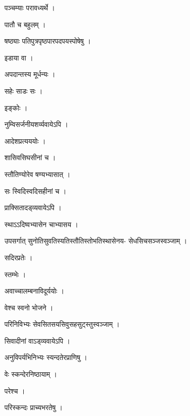 \documentclass[10pt, openany]{book}
\begin{document}
\noindent पञ्चम्याः परावध्यर्थे ।

\noindent पातौ च बहुलम् ।

\noindent षष्ठ्याः पतिपुत्रपृष्ठपारपदपयस्पोषेषु ।

\noindent इडाया वा ।

\noindent अपदान्तस्य मूर्धन्यः ।

\noindent सहेः साडः सः ।

\noindent इङ्कोः ।

\noindent नुम्विसर्जनीयशर्व्यवायेऽपि ।

\noindent आदेशप्रत्यययोः ।

\noindent शासिवसिघसीनां च ।

\noindent स्तौतिण्योरेव षण्यभ्यासात् ।

\noindent सः स्विदिस्वदिसहीनां च ।

\noindent प्राक्सितादड्व्यवायेऽपि ।

\noindent स्थाऽऽदिष्वभ्यासेन चाभ्यासय ।

\noindent उपसर्गात् सुनोतिसुवतिस्यतिस्तौतिस्तोभतिस्थासेनय- सेधसिचसञ्जस्वञ्जाम् ।

\noindent सदिरप्रतेः ।

\noindent स्तम्भेः ।

\noindent अवाच्चालम्बनाविदूर्ययोः ।

\noindent वेश्च स्वनो भोजने ।

\noindent परिनिविभ्यः सेवसितसयसिवुसहसुट्स्तुस्वञ्जाम् ।

\noindent सिवादीनां वाऽड्व्यवायेऽपि ।

\noindent अनुविपर्यभिनिभ्यः स्यन्दतेरप्राणिषु ।

\noindent वेः स्कन्देरनिष्ठायाम् ।

\noindent परेश्च ।

\noindent परिस्कन्दः प्राच्यभरतेषु ।
\end{document}
